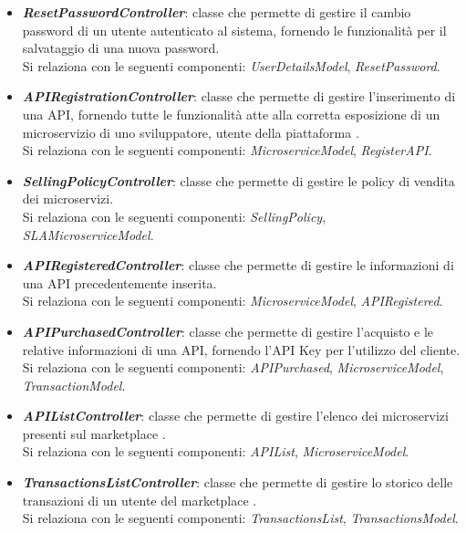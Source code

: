 \begin{itemize}
\begin{itemize}
		\item \textbf{\textit{ResetPasswordController}}: classe che permette di gestire il cambio password di un utente autenticato al sistema, fornendo le funzionalità per il salvataggio di una nuova password.\\
		Si relaziona con le seguenti componenti: \textit{UserDetailsModel}, \textit{ResetPassword}.
		
		\item \textbf{\textit{APIRegistrationController}}: classe che permette di gestire l'inserimento di una API, fornendo tutte le funzionalità atte alla corretta esposizione di un microservizio di uno sviluppatore, utente della piattaforma \progetto.\\
		Si relaziona con le seguenti componenti: \textit{MicroserviceModel}, \textit{RegisterAPI}.
		
		\item \textbf{\textit{SellingPolicyController}}: classe che permette di gestire le policy di vendita dei microservizi.\\
		Si relaziona con le seguenti componenti: \textit{SellingPolicy}, \textit{SLAMicroserviceModel}.
		
		\item \textbf{\textit{APIRegisteredController}}: classe che permette di gestire le informazioni di una API precedentemente inserita.\\
		Si relaziona con le seguenti componenti: \textit{MicroserviceModel}, \textit{APIRegistered}.
		
		\item \textbf{\textit{APIPurchasedController}}: classe che permette di gestire l'acquisto e le relative informazioni di una API, fornendo l'API Key per l'utilizzo del cliente.\\
		Si relaziona con le seguenti componenti: \textit{APIPurchased}, \textit{MicroserviceModel}, \textit{TransactionModel}.
		
		\item \textbf{\textit{APIListController}}: classe che permette di gestire l'elenco dei microservizi presenti sul marketplace \progetto.\\
		Si relaziona con le seguenti componenti: \textit{APIList}, \textit{MicroserviceModel}.
		
		\item \textbf{\textit{TransactionsListController}}: classe che permette di gestire lo storico delle transazioni di un utente del marketplace \progetto.\\
		Si relaziona con le seguenti componenti: \textit{TransactionsList}, \textit{TransactionsModel}.
		

\end{itemize}
\end{itemize}
